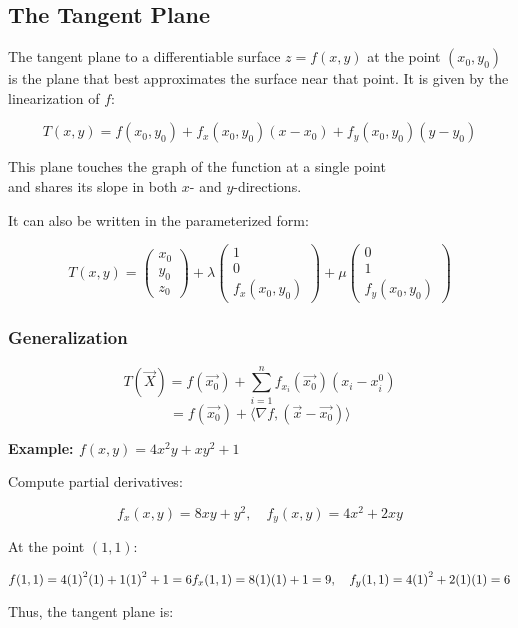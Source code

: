 \subsection{The Tangent Plane}

The tangent plane to a differentiable surface \( z = f(x, y) \) at the point \( (x_0, y_0) \) is the 
plane that best approximates the surface near that point. It is given by the linearization of \(f\):

\[
    T(x, y) = f(x_0, y_0) + f_x(x_0, y_0)(x - x_0) + f_y(x_0, y_0)(y - y_0)
\]

This plane touches the graph of the function at a single point\\
and shares its slope in both \(x\)- and \(y\)-directions.

It can also be written in the parameterized form:

\[
    T(x,y) = \begin{pmatrix} x_0\\ y_0\\ z_0\end{pmatrix} + \lambda 
    \begin{pmatrix} 1\\ 0 \\ f_x(x_0,y_0)\end{pmatrix} + \mu \begin{pmatrix}
    0 \\ 1 \\ f_y(x_0, y_0)
    \end{pmatrix}
\]

\subsubsection{Generalization}

\[
    T(\vec{X}) = f(\vec{x_0}) + \sum_{i = 1}^{n} f_{x_i}(\vec{x_0})(x_i - x_{i}^0)
\]
\[
    = f(\vec{x_0}) + \langle \nabla f, (\vec{x} - \vec{x_0})\rangle
\]

\textbf{Example: \( f(x, y) = 4x^2y + xy^2 + 1 \)}

Compute partial derivatives:

\[
    f_x(x, y) = 8xy + y^2, \quad f_y(x, y) = 4x^2 + 2xy
\]

At the point \( (1, 1) \):

\[
    f(1, 1) = 4{(1)}^2(1) + 1{(1)}^2 + 1 = 6 \\
    f_x(1, 1) = 8(1)(1) + 1 = 9, \quad f_y(1, 1) = 4{(1)}^2 + 2(1)(1) = 6
\]

Thus, the tangent plane is:

